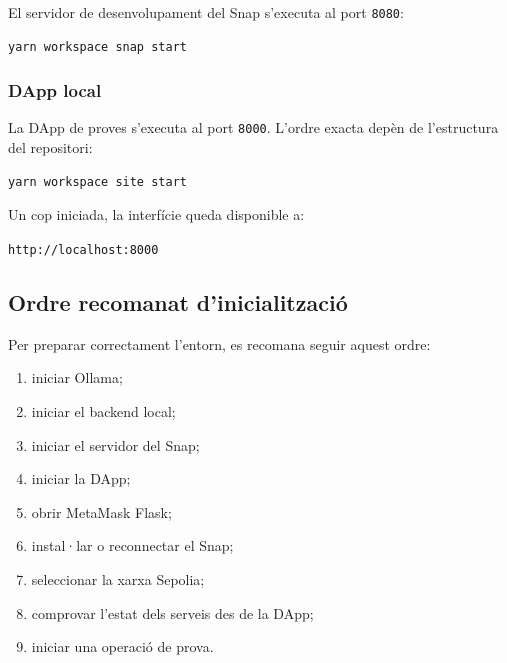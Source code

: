 El servidor de desenvolupament del Snap s’executa al port \texttt{8080}:

\begin{lstlisting}[language=bash]
yarn workspace snap start
\end{lstlisting}

\subsubsection{DApp local}

La DApp de proves s’executa al port \texttt{8000}. L’ordre exacta depèn de l’estructura del repositori:

\begin{lstlisting}[language=bash]
yarn workspace site start
\end{lstlisting}

Un cop iniciada, la interfície queda disponible a:

\begin{center}
\texttt{http://localhost:8000}
\end{center}

\subsection{Ordre recomanat d’inicialització}

Per preparar correctament l’entorn, es recomana seguir aquest ordre:

\begin{enumerate}
    \item iniciar Ollama;
    \item iniciar el backend local;
    \item iniciar el servidor del Snap;
    \item iniciar la DApp;
    \item obrir MetaMask Flask;
    \item instal·lar o reconnectar el Snap;
    \item seleccionar la xarxa Sepolia;
    \item comprovar l’estat dels serveis des de la DApp;
    \item iniciar una operació de prova.
\end{enumerate}
